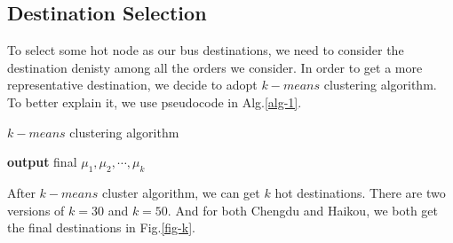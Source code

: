 \documentclass{llncs}
\begin{document}
\subsection{Destination Selection}
To select some hot node as our bus destinations, we need to consider the destination denisty among all the orders we consider. In order to get a more representative destination, we decide to adopt $k-means$ clustering algorithm. To better explain it, we use pseudocode in Alg.\ref{alg-1}.

\begin{minipage}[t]{0.8\textwidth}
	\begin{algorithm}[H]
		\label{alg-1}
		\BlankLine
		\caption{$k-means$ clustering algorithm}
		
		\textbf{output} final $\mu_1,\mu_2,\cdots,\mu_k$\;
	\end{algorithm}
\end{minipage}

After $k-means$ cluster algorithm, we can get $k$ hot destinations. There are two versions of $k=30$ and $k=50$. And for both Chengdu and Haikou, we both get the final destinations in Fig.\ref{fig-k}.
\end{document}
